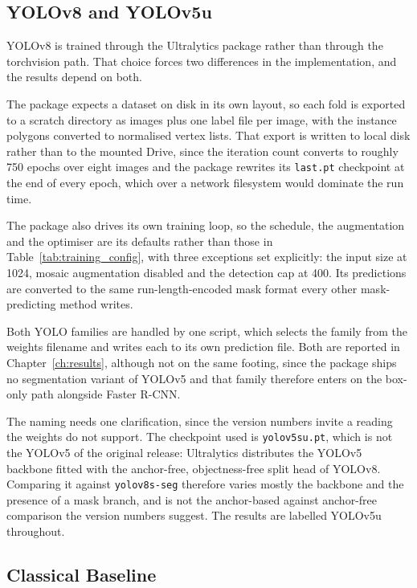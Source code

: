 \subsection{YOLOv8 and YOLOv5u}

YOLOv8 is trained through the Ultralytics package rather than through the
torchvision path. That choice forces two differences in the implementation, and
the results depend on both.

The package expects a dataset on disk in its own layout, so each fold is exported
to a scratch directory as images plus one label file per image, with the instance
polygons converted to normalised vertex lists. That export is written to local
disk rather than to the mounted Drive, since the iteration count converts to roughly
750 epochs over eight images and the package rewrites its \texttt{last.pt}
checkpoint at the end of every epoch, which over a network filesystem would
dominate the run time.

The package also drives its own training loop, so the schedule, the augmentation
and the optimiser are its defaults rather than those in
Table~\ref{tab:training_config}, with three exceptions set explicitly: the input
size at 1024, mosaic augmentation disabled and the detection cap at 400. Its
predictions are converted to the same run-length-encoded mask format every other
mask-predicting method writes.

Both YOLO families are handled by one script, which selects the family from the
weights filename and writes each to its own prediction file. Both are reported in
Chapter~\ref{ch:results}, although not on the same footing, since the package
ships no segmentation variant of YOLOv5 and that family therefore enters on the
box-only path alongside Faster R-CNN.

The naming needs one clarification, since the version numbers invite a
reading the weights do not support. The checkpoint used is \texttt{yolov5su.pt},
which is not the YOLOv5 of the original release: Ultralytics distributes the
YOLOv5 backbone fitted with the anchor-free, objectness-free split head of YOLOv8.
Comparing it against \texttt{yolov8s-seg} therefore varies mostly the backbone and
the presence of a mask branch, and is not the anchor-based against anchor-free
comparison the version numbers suggest. The results are labelled YOLOv5u
throughout.

\subsection{Classical Baseline}

